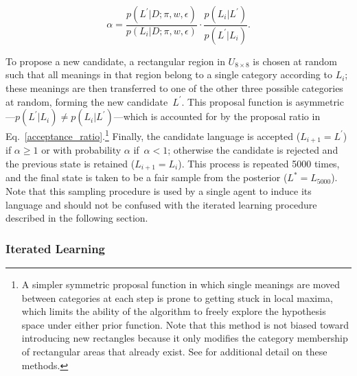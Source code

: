\documentclass[doc,biblatex]{apa7}
\begin{document}
	\begin{equation}
	\alpha = \frac{p(L^\prime|D; \pi,w,\epsilon)}{p(L_i|D; \pi,w,\epsilon)} \cdot \frac{p(L_i|L^\prime)}{p(L^\prime|L_i)}.
	\label{acceptance_ratio}
	\end{equation}

\noindent To propose a new candidate, a rectangular region in $U_{8 \times 8}$ is chosen at random such that all meanings in that region belong to a single category according to $L_i$; these meanings are then transferred to one of the other three possible categories at random, forming the new candidate~$L^\prime$. This proposal function is asymmetric---$p(L^\prime|L_i) \neq p(L_i|L^\prime)$---which is accounted for by the proposal ratio in Eq.~\ref{acceptance_ratio}.\footnote{A simpler symmetric proposal function in which single meanings are moved between categories at each step is prone to getting stuck in local maxima, which limits the ability of the algorithm to freely explore the hypothesis space under either prior function. Note that this method is not biased toward introducing new rectangles because it only modifies the category membership of rectangular areas that already exist. See \textcite[p.~97--102]{Carr:2019} for additional detail on these methods.} Finally, the candidate language is accepted ($L_{i+1} = L^\prime$) if $\alpha \geq 1$ or with probability $\alpha$ if~$\alpha < 1$; otherwise the candidate is rejected and the previous state is retained ($L_{i+1} = L_i$). This process is repeated 5000 times, and the final state is taken to be a fair sample from the posterior ($L^\ast = L_{5000}$). Note that this sampling procedure is used by a single agent to induce its language and should not be confused with the iterated learning procedure described in the following section.

\subsubsection{Iterated Learning}
\end{document}

